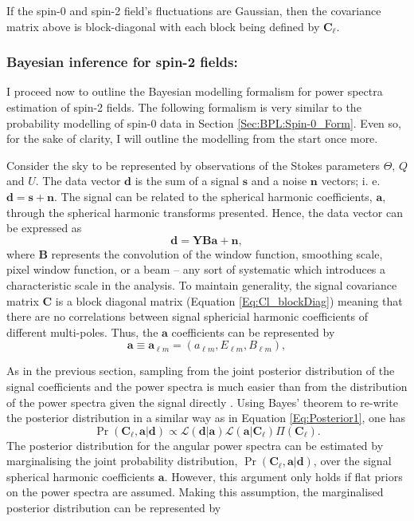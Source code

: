 \noindent If the spin-0 and spin-2 field's fluctuations are Gaussian, then the covariance matrix above is block-diagonal with each block being defined by $\mathbf{C}_{\ell}$. 

\subsubsection{Bayesian inference for spin-2 fields:}
I proceed now to outline the Bayesian modelling formalism for power spectra estimation of spin-2 fields. The following formalism is very similar to the probability modelling of spin-0 data in Section %
\ref{Sec:BPL:Spin-0_Form}. Even so, for the sake of clarity, I will outline the modelling from the start once more. 

\qquad Consider the sky to be represented by observations of the Stokes parameters $\Theta,\, Q$ and $U$. The data vector $\mathbf{d}$ is the sum of a signal $\mathbf{s}$ and a noise $\mathbf{n}$ vectors; i. e. $\mathbf{d}=\mathbf{s}+\mathbf{n}$.  The signal can be related to the spherical harmonic coefficients, $\mathbf{a}$, through the spherical harmonic transforms presented. Hence, the data vector can be expressed as
\begin{equation}
\mathbf{d}=\mathbf{YBa}+\mathbf{n},
\end{equation}
\noindent where $\mathbf{B}$ represents the convolution of the window function, smoothing scale, pixel window function, or a beam -- any sort of systematic which introduces a characteristic scale in the analysis. To maintain generality, the signal covariance matrix $\mathbf{C}$ is a block diagonal matrix (Equation \ref{Eq:Cl_blockDiag}) meaning that there are no correlations between signal sphericial harmonic coefficients of different multi-poles. Thus, the $\bm{a}$ coefficients can be represented by
\begin{equation}
\mathbf{a} \equiv \mathbf{a}_{\ell m}=\left( a_{\ell m},E_{\ell m},B_{\ell m}\right),
\end{equation}

\qquad As in the previous section, sampling from the joint posterior distribution of the signal coefficients and the power spectra is much easier than from the distribution of the power spectra given the signal directly \citep{Wandelt2004,Larson2007,AlmostBlackPearl2016}. Using Bayes' theorem to re-write the posterior distribution in a similar way as in Equation \ref{Eq:Posterior1}, one has
\begin{equation}
\Pr(\mathbf{C}_{\ell},\mathbf{a}|\mathbf{d}) \propto\mathcal{L}(\mathbf{d}|\mathbf{a})\mathcal{L}(\mathbf{a}|\mathbf{C}_{\ell})\Pi(\mathbf{C}_{\ell}).
\label{Eq:FullPost}
\end{equation}
The posterior distribution for the angular power spectra can be estimated by marginalising the joint probability distribution, $\Pr(\mathbf{C}_{\ell },\mathbf{a}|\mathbf{d})$, over the signal spherical harmonic coefficients $\mathbf{a}$. However, this argument only holds if flat priors on the power spectra are assumed. Making this assumption, the marginalised posterior distribution can be represented by

